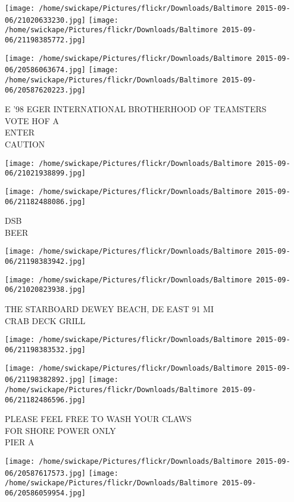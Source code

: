 \documentclass[10pt,letterpaper]{article}
\begin{document}
\texttt{[image: /home/swickape/Pictures/flickr/Downloads/Baltimore 2015-09-06/21020633230.jpg]}
\texttt{[image: /home/swickape/Pictures/flickr/Downloads/Baltimore 2015-09-06/21198385772.jpg]}

\texttt{[image: /home/swickape/Pictures/flickr/Downloads/Baltimore 2015-09-06/20586063674.jpg]}
\texttt{[image: /home/swickape/Pictures/flickr/Downloads/Baltimore 2015-09-06/20587620223.jpg]}

E '98 EGER INTERNATIONAL BROTHERHOOD OF TEAMSTERS\\
VOTE HOF A\\
ENTER\\
CAUTION
\pagebreak

\texttt{[image: /home/swickape/Pictures/flickr/Downloads/Baltimore 2015-09-06/21021938899.jpg]}

\vspace{0.25in}
\texttt{[image: /home/swickape/Pictures/flickr/Downloads/Baltimore 2015-09-06/21182488086.jpg]}

DSB\\
BEER
\pagebreak

\texttt{[image: /home/swickape/Pictures/flickr/Downloads/Baltimore 2015-09-06/21198383942.jpg]}

\vspace{0.25in}
\texttt{[image: /home/swickape/Pictures/flickr/Downloads/Baltimore 2015-09-06/21020823938.jpg]}

THE STARBOARD DEWEY BEACH, DE EAST 91 MI\\
CRAB DECK GRILL
\pagebreak

\texttt{[image: /home/swickape/Pictures/flickr/Downloads/Baltimore 2015-09-06/21198383532.jpg]}

\vspace{0.25in}
\texttt{[image: /home/swickape/Pictures/flickr/Downloads/Baltimore 2015-09-06/21198382892.jpg]}
\texttt{[image: /home/swickape/Pictures/flickr/Downloads/Baltimore 2015-09-06/21182486596.jpg]}

PLEASE FEEL FREE TO WASH YOUR CLAWS\\
FOR SHORE POWER ONLY\\
PIER A
\pagebreak

\texttt{[image: /home/swickape/Pictures/flickr/Downloads/Baltimore 2015-09-06/20587617573.jpg]}
\texttt{[image: /home/swickape/Pictures/flickr/Downloads/Baltimore 2015-09-06/20586059954.jpg]}
\end{document}
